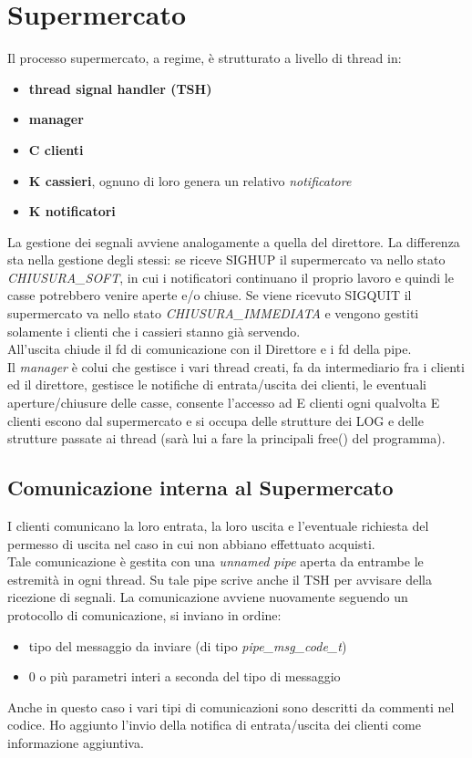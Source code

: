 \documentclass[11pt, a4paper]{article}
\begin{document}
\section{Supermercato}
Il processo supermercato, a regime, è strutturato a livello di thread in:
\begin{itemize}
\item \textbf{thread signal handler (TSH)}
\item \textbf{manager}
\item \textbf{C clienti}
\item \textbf{K cassieri}, ognuno di loro genera un relativo \textit{notificatore}
\item \textbf{K notificatori}
\end{itemize}
La gestione dei segnali avviene analogamente a quella del direttore. La differenza sta nella gestione degli stessi: se riceve SIGHUP il supermercato va nello stato \textit{CHIUSURA\_SOFT}, in cui i notificatori continuano il proprio lavoro e quindi le casse potrebbero venire aperte e/o chiuse. Se viene ricevuto SIGQUIT il supermercato va nello stato \textit{CHIUSURA\_IMMEDIATA} e vengono gestiti solamente i clienti che i cassieri stanno già servendo.\\
All'uscita chiude il fd di comunicazione con il Direttore e i fd della pipe.\\
Il \textit{manager} è colui che gestisce i vari thread creati, fa da intermediario fra i clienti ed il direttore, gestisce le notifiche di entrata/uscita dei clienti, le eventuali aperture/chiusure delle casse, consente l'accesso ad E clienti ogni qualvolta E clienti escono dal supermercato e si occupa delle strutture dei LOG e delle strutture passate ai thread (sarà lui a fare la principali free() del programma).
\subsection{Comunicazione interna al Supermercato}
I clienti comunicano la loro entrata, la loro uscita e l'eventuale richiesta del permesso di uscita nel caso in cui non abbiano effettuato acquisti.\\
Tale comunicazione è gestita con una \textit{unnamed pipe} aperta da entrambe le estremità in ogni thread. 
Su tale pipe scrive anche il TSH per avvisare della ricezione di segnali.
La comunicazione avviene nuovamente seguendo un protocollo di comunicazione, si inviano in ordine:
\begin{itemize}
\item tipo del messaggio da inviare (di tipo \textit{pipe\_msg\_code\_t})
\item 0 o più parametri interi a seconda del tipo di messaggio
\end{itemize}
Anche in questo caso i vari tipi di comunicazioni sono descritti da commenti nel codice.
Ho aggiunto l'invio della notifica di entrata/uscita dei clienti come informazione aggiuntiva.
\end{document}

